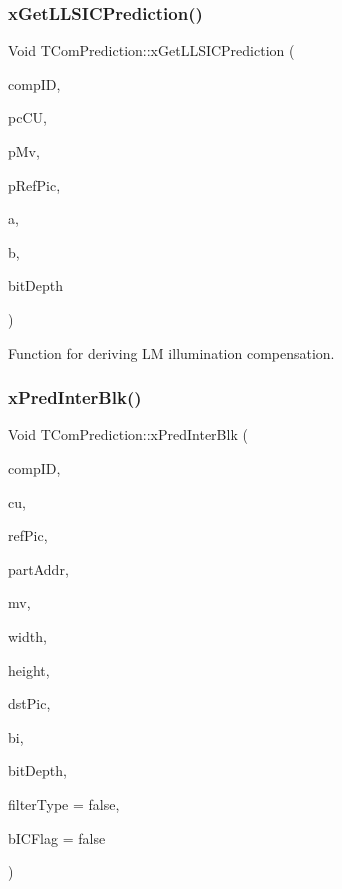 \subsubsection{\texorpdfstring{x\+Get\+L\+L\+S\+I\+C\+Prediction()}{xGetLLSICPrediction()}}
{\footnotesize\ttfamily Void T\+Com\+Prediction\+::x\+Get\+L\+L\+S\+I\+C\+Prediction (\begin{DoxyParamCaption}\item[{const Component\+ID}]{comp\+ID,  }\item[{\hyperlink{class_t_com_data_c_u}{T\+Com\+Data\+CU} $\ast$}]{pc\+CU,  }\item[{\hyperlink{class_t_com_mv}{T\+Com\+Mv} $\ast$}]{p\+Mv,  }\item[{\hyperlink{class_t_com_pic_yuv}{T\+Com\+Pic\+Yuv} $\ast$}]{p\+Ref\+Pic,  }\item[{Int \&}]{a,  }\item[{Int \&}]{b,  }\item[{const Int}]{bit\+Depth }\end{DoxyParamCaption})\hspace{0.3cm}{\ttfamily [protected]}}

Function for deriving LM illumination compensation. \mbox{\label{class_t_com_prediction_a7a9e256d00059c789e8d4502a0047a63}} 
\subsubsection{\texorpdfstring{x\+Pred\+Inter\+Blk()}{xPredInterBlk()}}
{\footnotesize\ttfamily Void T\+Com\+Prediction\+::x\+Pred\+Inter\+Blk (\begin{DoxyParamCaption}\item[{const Component\+ID}]{comp\+ID,  }\item[{\hyperlink{class_t_com_data_c_u}{T\+Com\+Data\+CU} $\ast$}]{cu,  }\item[{\hyperlink{class_t_com_pic_yuv}{T\+Com\+Pic\+Yuv} $\ast$}]{ref\+Pic,  }\item[{U\+Int}]{part\+Addr,  }\item[{\hyperlink{class_t_com_mv}{T\+Com\+Mv} $\ast$}]{mv,  }\item[{Int}]{width,  }\item[{Int}]{height,  }\item[{\hyperlink{class_t_com_yuv}{T\+Com\+Yuv} $\ast$}]{dst\+Pic,  }\item[{Bool}]{bi,  }\item[{const Int}]{bit\+Depth,  }\item[{Bool}]{filter\+Type = {\ttfamily false},  }\item[{Bool}]{b\+I\+C\+Flag = {\ttfamily false} }\end{DoxyParamCaption})\hspace{0.3cm}{\ttfamily [protected]}}



